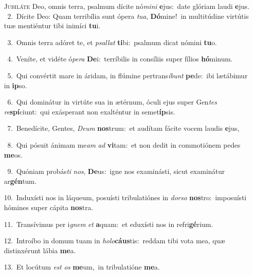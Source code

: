 \lettrine{\initial\textcolor{\initialcolor}{J}}{ubiláte} Deo, omnis terra, psalmum dícite nó\-\textit{mi}\-\textit{ni} \textbf{e}\-jus:~\star date glóriam laudi \textbf{e}\-jus.\\
{\numbfont\textcolor{\numbcolor}{~2.}}~Dícite Deo: Quam terribília sunt ópera \textit{tu}\-\textit{a}, \textbf{Dó}\-mine!~\star in multitúdine virtútis tuæ mentiéntur tibi inimíci \textbf{tu}\-i.\par
{\numbfont\textcolor{\numbcolor}{~3.}}~Omnis terra adóret te, et \textit{psal}\-\textit{lat} \textbf{ti}\-bi:~\star psalmum dicat nómini \textbf{tu}\-o.\par
{\numbfont\textcolor{\numbcolor}{~4.}}~Veníte, et vidéte ó\-\textit{pe}\-\textit{ra} \textbf{De}\-i:~\star terríbilis in consíliis super fílios \textbf{hó}\-minum.\par
{\numbfont\textcolor{\numbcolor}{~5.}}~Qui convértit mare in áridam, in flúmine pertrans\-\textit{í}\-\textit{bunt} \textbf{pe}\-de:~\star ibi lætábimur in \textbf{ip}\-so.\par
{\numbfont\textcolor{\numbcolor}{~6.}}~Qui dominátur in virtúte sua in ætérnum, óculi ejus super Gen\textit{tes} \textit{re}\-\textbf{spí}ciunt:~\star qui exásperant non exalténtur in semet\-\textbf{íp}\-sis.\par
{\numbfont\textcolor{\numbcolor}{~7.}}~Benedícite, Gentes, \textit{De}\-\textit{um} \textbf{nos}\-trum:~\star et audítam fácite vocem laudis \textbf{e}\-jus,\par
{\numbfont\textcolor{\numbcolor}{~8.}}~Qui pósuit ánimam me\textit{am} \textit{ad} \textbf{vi}\-tam:~\star et non dedit in commotiónem pedes \textbf{me}\-os.\par
{\numbfont\textcolor{\numbcolor}{~9.}}~Quóniam probás\textit{ti} \textit{nos}\-, \textbf{De}\-us:~\star igne nos examinásti, sicut examinátur ar\-\textbf{gén}\-tum.\par
{\numbfont\textcolor{\numbcolor}{10.}}~Induxísti nos in láqueum, posuísti tribulatiónes in \textit{dor}\-\textit{so} \textbf{nos}\-tro:~\star imposuísti hómines super cápita \textbf{nos}\-tra.\par
{\numbfont\textcolor{\numbcolor}{11.}}~Transívimus per i\textit{gnem} \textit{et} \textbf{a}\-quam:~\star et eduxísti nos in refri\-\textbf{gé}\-rium.\par
{\numbfont\textcolor{\numbcolor}{12.}}~Introíbo in domum tuam in \textit{ho}\-\textit{lo}\textbf{cáus}tis:~\star reddam tibi vota mea, quæ distinxérunt lábia \textbf{me}\-a.\par
{\numbfont\textcolor{\numbcolor}{13.}}~Et locútum \textit{est} \textit{os} \textbf{me}\-um,~\star in tribulatióne \textbf{me}\-a.\par
